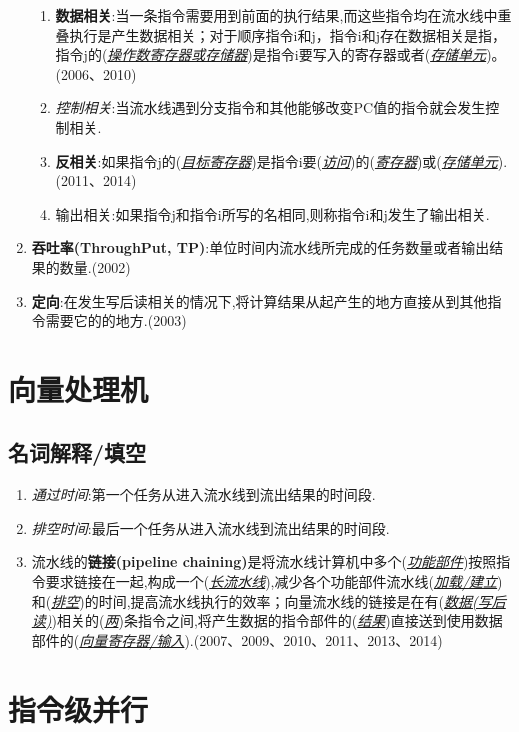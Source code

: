 \documentclass[a4paper]{ctexart}
\newcommand{\blank}[1]{(\emph{\underline{#1}})}
\begin{document}
\begin{enumerate}
\begin{enumerate}
    \item \textbf{数据相关}:当一条指令需要用到前面的执行结果,而这些指令均在流水线中重叠执行是产生数据相关；对于顺序指令i和j，指令i和j存在数据相关是指，指令j的\blank{操作数寄存器或存储器}是指令i要写入的寄存器或者\blank{存储单元}。(2006、2010)
    \item \emph{控制相关}:当流水线遇到分支指令和其他能够改变PC值的指令就会发生控制相关.
    \item \textbf{反相关}:如果指令j的\blank{目标寄存器}是指令i要\blank{访问}的\blank{寄存器}或\blank{存储单元}.(2011、2014)
    \item 输出相关:如果指令j和指令i所写的名相同,则称指令i和j发生了输出相关.
  \end{enumerate}
  \item \textbf{吞吐率(ThroughPut, TP)}:单位时间内流水线所完成的任务数量或者输出结果的数量.(2002)
  \item \textbf{定向}:在发生写后读相关的情况下,将计算结果从起产生的地方直接从到其他指令需要它的的地方.(2003)
\end{enumerate}

\newpage
\section{向量处理机}
\subsection{名词解释/填空}
\begin{enumerate}
  \item \emph{通过时间}:第一个任务从进入流水线到流出结果的时间段.
  \item \emph{排空时间}:最后一个任务从进入流水线到流出结果的时间段.
  \item 流水线的\textbf{链接(pipeline chaining)}是将流水线计算机中多个(\emph{\underline{功能部件}})按照指令要求链接在一起,构成一个\blank{长流水线},减少各个功能部件流水线(\emph{\underline{加载/建立}})和\blank{排空}的时间,提高流水线执行的效率；向量流水线的链接是在有\blank{数据(写后读)}相关的\blank{两}条指令之间,将产生数据的指令部件的\blank{结果}直接送到使用数据部件的\blank{向量寄存器/输入}.(2007、2009、2010、2011、2013、2014)
\end{enumerate}

\newpage
\section{指令级并行}
\end{document}
